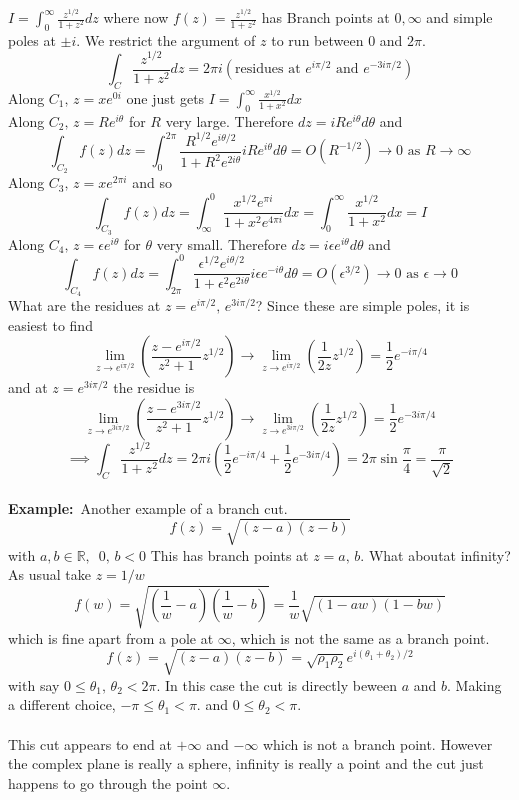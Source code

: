 \documentclass{article}
\newcommand{\example}{\textbf{Example:}}
\begin{document}
$\displaystyle I = \int^{\infty}_0 \frac{z^{1/2}}{1+z^2} dz$ where now
$\displaystyle f(z)= \frac{z^{1/2}}{1+z^2} $ has Branch points at
$0,\infty$ and simple poles at $\pm i$. We restrict the argument of $z$ to
run between $0$ and $2\pi$.
\[ \int_C \frac{z^{1/2}}{1+z^2} dz = 2\pi i \left( \mbox{residues at }
e^{i\pi /2} \mbox{ and } e^{-3i\pi /2} \right) \]
Along $C_1, \, z = x e^{0i}$ one just gets 
$\displaystyle I = \int^{\infty}_0 \frac{x^{1/2}}{1+x^2} dx$\\
Along $C_2, \, z = R e^{i\theta}$ for $R$ very large. Therefore
$dz = iR e^{i\theta} d\theta$ and
\[ \int_{C_2} f(z) dz = \int_0^{2\pi} \frac{R^{1/2} e^{i\theta/2}}{1 + R^2 e^{2i\theta}} 
i R e^{i\theta} d\theta = O(R^{-1/2}) \to 0 \mbox{ as } R \to \infty \]
Along $C_3, \, z = x e^{2\pi i}$  and so 
\[ \int_{C_3} f(z) dz = \int_{\infty}^0 \frac{x^{1/2} e^{\pi i} }{1+ x^2 e^{4\pi i}} dx
= \int_0^{\infty} \frac{x^{1/2}}{1+x^2} dx = I \]
Along $C_4, \, z = \epsilon e^{i\theta}$ for $\theta$ very small. Therefore
$dz = i\epsilon e^{i\theta} d\theta$ and
\[ \int_{C_4} f(z) dz = \int_{2\pi}^0 \frac{\epsilon^{1/2} e^{i\theta/2}}
{1 + \epsilon^2 e^{2i\theta}} i \epsilon e^{-i\theta} d\theta = O(\epsilon^{3/2})
\to 0 \mbox{ as } \epsilon \to 0 \]
What are the residues at $z = e^{i \pi /2}, \, e^{3 i \pi /2} $?
Since these are simple poles, it is easiest to find
\[ \lim_{z \to e^{i\pi/2}} \left( \frac{z - e^{i\pi /2}}{z^2 + 1} z^{1/2} 
\right) \to  \lim_{z \to e^{i\pi/2}} \left( \frac{1}{2z} z^{1/2} \right)
= \frac{1}{2} e^{-i\pi /4} \]
and at $z = e^{3i \pi /2}$ the residue is 
\[ \lim_{z \to e^{3i\pi/2}} \left( \frac{z - e^{3i\pi /2}}{z^2 + 1} z^{1/2} 
\right) \to  \lim_{z \to e^{3i\pi/2}} \left( \frac{1}{2z} z^{1/2} \right)
= \frac{1}{2} e^{-3i\pi /4} \]
\[ \implies \int_C \frac{z^{1/2}}{1+z^2} dz = 2\pi i \left(
\frac{1}{2} e^{-i \pi /4} + \frac{1}{2} e^{-3i\pi /4} \right) =
2\pi \sin \frac{\pi}{4} = \frac{\pi}{\sqrt{2}} \]
\\
\example\ Another example of a branch cut.
\[f(z) = \sqrt{(z-a)(z-b)}\]
with $a,b \in \mathbb{R}, \; \>0,\, b<0$ This has branch points at $z= a, \, b$.
What aboutat infinity? As usual take $z = 1/w$
\[f(w) = \sqrt{\left(\frac{1}{w} - a\right)\left(\frac{1}{w} -b\right)} 
= \frac{1}{w} \sqrt{(1-aw)(1-bw)}\]
which is fine apart from a pole at $\infty$, which is not the same as a branch 
point. 
\[f(z) = \sqrt{(z-a)(z-b)} = \sqrt{\rho_1 \rho_2}e^{i(\theta_1+\theta_2)/2}\]
with say $0 \leq \theta_1 , \, \theta_2 < 2\pi$. In this case the cut is 
directly beween $a$ and $b$. Making a different choice, $-\pi \leq \theta_1 < \pi$.
and $0 \leq \theta_2 < \pi$.
\\
\\
This cut appears to end at $+\infty$ and $-\infty$ which is not a branch point.
However the complex plane is really a sphere, infinity is really a point and 
the cut just happens to go through the point $\infty$.
%
%
\end{document}
